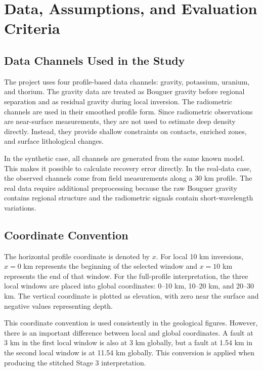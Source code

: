 \documentclass[12pt,a4paper]{article}
\begin{document}
\clearpage
\section{Data, Assumptions, and Evaluation Criteria}
\subsection{Data Channels Used in the Study}
The project uses four profile-based data channels: gravity, potassium, uranium, and thorium. The gravity data are treated as Bouguer gravity before regional separation and as residual gravity during local inversion. The radiometric channels are used in their smoothed profile form. Since radiometric observations are near-surface measurements, they are not used to estimate deep density directly. Instead, they provide shallow constraints on contacts, enriched zones, and surface lithological changes.

In the synthetic case, all channels are generated from the same known model. This makes it possible to calculate recovery error directly. In the real-data case, the observed channels come from field measurements along a 30 km profile. The real data require additional preprocessing because the raw Bouguer gravity contains regional structure and the radiometric signals contain short-wavelength variations.

\subsection{Coordinate Convention}
The horizontal profile coordinate is denoted by $x$. For local 10 km inversions, $x=0$ km represents the beginning of the selected window and $x=10$ km represents the end of that window. For the full-profile interpretation, the three local windows are placed into global coordinates: 0--10 km, 10--20 km, and 20--30 km. The vertical coordinate is plotted as elevation, with zero near the surface and negative values representing depth.

This coordinate convention is used consistently in the geological figures. However, there is an important difference between local and global coordinates. A fault at 3 km in the first local window is also at 3 km globally, but a fault at 1.54 km in the second local window is at 11.54 km globally. This conversion is applied when producing the stitched Stage 3 interpretation.
\end{document}
